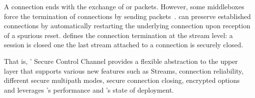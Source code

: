 A \tcp connection ends with the exchange of \fin or \rst packets. However, some
middleboxes force the termination of \tcp connections by sending \rst
packets~\cite{rfc3360,weaver2009detecting}. \tcpls can preserve established
connections by automatically restarting the underlying \tcp connection upon
reception of a spurious reset. \tcpls defines the connection termination at the
stream level: a \tcpls session is closed one the last stream attached to a
\tcp connection is securely closed. 

That is, \tcpls' Secure Control Channel provides a flexible abstraction
to the upper layer that supports various new features such as
Streams, connection reliability, different secure multipath modes, secure
connection closing,  encrypted \tcp options and leverages \tcp's performance and \tls's state of deployment.


